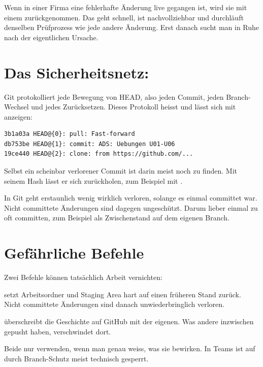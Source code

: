 \begin{praxis}
Wenn in einer Firma eine fehlerhafte Änderung live gegangen ist, wird sie mit einem
 zurückgenommen. Das geht schnell, ist nachvollziehbar und durchläuft denselben
Prüfprozess wie jede andere Änderung. Erst danach sucht man in Ruhe nach der eigentlichen
Ursache.
\end{praxis}

\section{Das Sicherheitsnetz: \texorpdfstring{}{git reflog}}

Git protokolliert jede Bewegung von HEAD, also jeden Commit, jeden Branch-Wechsel und jedes
Zurücksetzen. Dieses Protokoll heisst  und lässt sich mit
 anzeigen:

\begin{lstlisting}[style=ausgabe]
3b1a03a HEAD@{0}: pull: Fast-forward
db753be HEAD@{1}: commit: ADS: Uebungen U01-U06
19ce440 HEAD@{2}: clone: from https://github.com/...
\end{lstlisting}

Selbst ein scheinbar verlorener Commit ist darin meist noch zu finden. Mit seinem Hash lässt
er sich zurückholen, zum Beispiel mit .

\begin{erfahrung}
In Git geht erstaunlich wenig wirklich verloren, solange es einmal committet war. Nicht
committete Änderungen sind dagegen ungeschützt. Darum lieber einmal zu oft committen,
zum Beispiel als Zwischenstand auf dem eigenen Branch.
\end{erfahrung}

\section{Gefährliche Befehle}

\begin{achtung}
Zwei Befehle können tatsächlich Arbeit vernichten:
\begin{description}[style=nextline, leftmargin=1.2cm]
  \item[\cmd{git reset --hard}] setzt Arbeitsordner und Staging Area hart auf einen
    früheren Stand zurück. Nicht committete Änderungen sind danach unwiederbringlich verloren.
  \item[\cmd{git push --force}] überschreibt die Geschichte auf GitHub mit der eigenen. Was
    andere inzwischen gepusht haben, verschwindet dort.
\end{description}
Beide nur verwenden, wenn man genau weiss, was sie bewirken. In Teams ist 
auf  durch Branch-Schutz meist technisch gesperrt.
\end{achtung}

